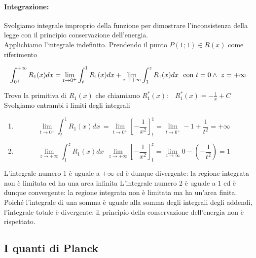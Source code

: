 \documentclass{article}
\begin{document}
\paragraph{Integrazione:} Svolgiamo integrale improprio della funzione per dimostrare l'inconsistenza della legge con il principio conservazione dell'energia.\\ Applichiamo l'integrale indefinito. Prendendo il punto $P(1;1) \in R(x)$ come riferimento
\begin{center}
\vspace*{-0.10in}
\[ \int_{0^+}^{+\infty} R_1(x)dx  
= \lim_{t\to 0^+} \int_{t}^{1}R_1(x)dx  + \lim_{z\to +\infty} \int_{1}^{z}R_1(x)dx \ \ \ 
\\ \text{con}\  t = 0 \wedge \ z = +\infty \]
\end{center}
Trovo la primitiva di $R_1(x)$  che chiamiamo $R_1^*(x)$:\ \  $R_1^*(x) = -\frac{1}{x} + C $
\\ Svolgiamo entrambi i limiti degli integrali 
\begin{enumerate}
\item \[ \lim_{t\to 0^+} \int_{t}^{1}R_1(x)dx\ = \lim_{t \to 0^+} \left[ -\frac{1}{x^2} \right]_t^1 = \lim_{t \to 0^+} -1 +\frac{1}{t^2} = +\infty \]
\item \[ \lim_{z\to +\infty} \int_{1}^{z}R_1(x)dx \ \ \lim_{z \to +\infty } \left[ -\frac{1}{x^2} \right]_1^z = \lim_{z \to \infty} 0 - \left( -\frac{1}{t^2} \right) = 1 \]
\end{enumerate}
L'integrale numero 1 è uguale a $+\infty$ ed è dunque divergente: la regione integrata non è limitata ed ha una area infinita
L'integrale numero 2 è uguale a $1$ ed è dunque convergente: la regione integrata non è limitata ma ha un'area finita.
Poiché l'integrale di una somma è uguale alla somma degli integrali degli addendi, l'integrale totale è divergente: il principio della conservazione dell'energia non è rispettato.   
\newpage
\subsection{I quanti di Planck}
\end{document}

